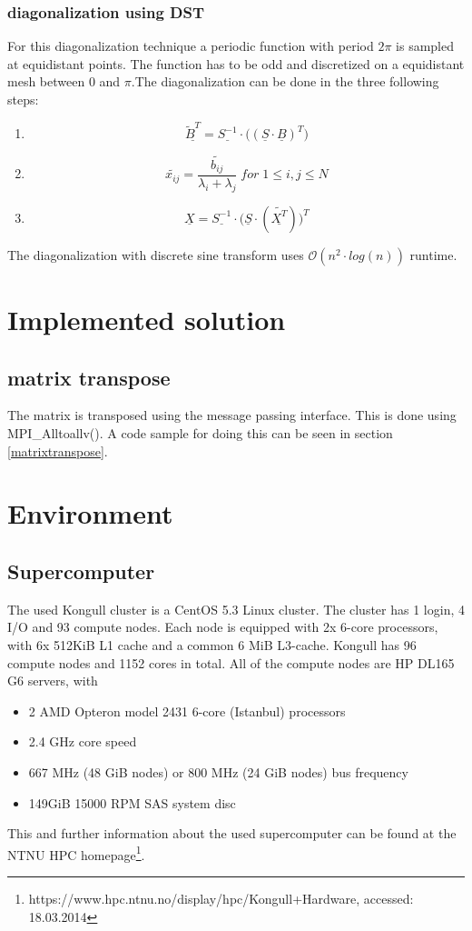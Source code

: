 \documentclass{article}
\begin{document}
\subsubsection{diagonalization using DST}
For this diagonalization technique a periodic function with period $2\pi$ is sampled at equidistant points. The function has to be odd and discretized on a equidistant mesh between 0 and $\pi$.The diagonalization can be done in the three following steps:
\begin{enumerate}
\item $$ \underline{\tilde{B}^T}=\underline{S^{-1}}\cdot\big((\underline{S}\cdot\underline{B})^T\big)$$
\item $$ \tilde{x_{ij}}=\frac{\tilde{b_{ij}}}{\lambda_i+\lambda_j}\;for\;1\leq i,j\leq N$$
\item $$ \underline{X}=\underline{S^{-1}}\cdot\big(\underline{S}\cdot(\underline{\tilde{X^T}})\big)^T$$
\end{enumerate}
The diagonalization with discrete sine transform uses $\mathcal{O}(n^2\cdot log(n))$ runtime.
\section{Implemented solution}
\subsection{matrix transpose}
The matrix is transposed using the message passing interface. This is done using MPI\_Alltoallv(). A code sample for doing this can be seen in section \ref{matrixtranspose}.
\section{Environment}
\subsection{Supercomputer}
The used Kongull cluster is a CentOS 5.3 Linux cluster. The cluster has 1 login, 4 I/O and 93 compute nodes. Each node is equipped with 2x 6-core processors, with 6x 512KiB L1 cache and a common 6 MiB L3-cache. Kongull has 96 compute nodes and 1152 cores in total. All of the compute nodes are HP DL165 G6 servers, with
\begin{itemize}
\item 2 AMD Opteron model 2431 6-core (Istanbul) processors
\item 2.4 GHz core speed
\item 667 MHz (48 GiB nodes) or 800 MHz (24 GiB nodes) bus frequency
\item 149GiB 15000 RPM SAS system disc
\end{itemize}
This and further information about the used supercomputer can be found at the NTNU HPC homepage\footnote{https://www.hpc.ntnu.no/display/hpc/Kongull+Hardware, accessed: 18.03.2014}.
\end{document}
